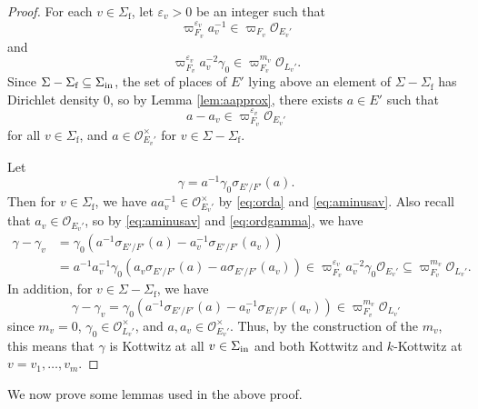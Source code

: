 \documentclass[11pt, reqno]{amsart}
\numberwithin{equation}{subsection}
\theoremstyle{plain}
\theoremstyle{definition}
\renewcommand{\O}{\mathcal O}
\newcommand{\inert}{\textnormal{in}}
\begin{document}
\begin{proof}
For each $v \in \Sigma_{\text{f}}$, let $\varepsilon_v > 0$
be an integer such that
\begin{equation}
\label{eq:orda}
    \varpi_{F_v}^{\varepsilon_v} a_v^{-1}
    \in \varpi_{F_v}\O_{E_v'}
\end{equation}
and
\begin{equation}
\label{eq:ordgamma}
   \varpi_{F_v}^{\varepsilon_v} a_v^{-2}\gamma_0
   \in \varpi_{F_v}^{m_v}\O_{L_v'}.
\end{equation}
Since $\Sigma - \Sigma_{\text{f}} \subseteq \Sigma_{\inert}$,
the set of places of $E'$ lying above an element of 
$\Sigma - \Sigma_{\text{f}}$ has Dirichlet density $0$, so
by Lemma \ref{lem:aapprox}, there exists
$a \in E'$ such that 
\begin{equation}
\label{eq:aminusav}
    a - a_v \in \varpi_{F_v}^{\varepsilon_v} \O_{E_v'}
\end{equation}
for all $v \in \Sigma_{\text{f}}$, and $a \in \O_{E_v'}^\times$
for $v \in \Sigma - \Sigma_{\text{f}}$.

Let
\[
    \gamma = a^{-1}\gamma_0\sigma_{E'/F'}(a).
\]
Then for $v \in \Sigma_{\text{f}}$, we have
$aa_v^{-1} \in \O_{E_v'}^\times$ by \eqref{eq:orda}
and \eqref{eq:aminusav}. Also recall that 
$a_v \in \O_{E_v'}$, so by \eqref{eq:aminusav}
and \eqref{eq:ordgamma}, we have
\begin{align*}
    \gamma - \gamma_v &= \gamma_0(a^{-1}\sigma_{E'/F'}(a) 
    - a_v^{-1}\sigma_{E'/F'}(a_v)) \\
    &= a^{-1}a_v^{-1}\gamma_0(a_v\sigma_{E'/F'}(a)
    - a\sigma_{E'/F'}(a_v)) \in \varpi_{F_v}^{\varepsilon_v} 
    a_v^{-2}\gamma_0 \O_{E_v'} \subseteq
    \varpi_{F_v}^{m_v}\O_{L_v'}.
\end{align*}
In addition, for $v \in \Sigma - \Sigma_{\text{f}}$, 
we have
\[
    \gamma - \gamma_v = \gamma_0(a^{-1}\sigma_{E'/F'}(a) 
    - a_v^{-1}\sigma_{E'/F'}(a_v)) \in \varpi_{F_v}^{m_v}\O_{L_v'}
\]
since $m_v = 0$, $\gamma_0 \in \O_{L_v'}^\times$,
and $a, a_v \in \O_{E_v'}^\times$.
Thus, by the construction of the $m_v$, this means
that $\gamma$ is Kottwitz at all $v \in \Sigma_{\inert}$ and
both Kottwitz and $k$-Kottwitz at $v = v_1, \dots, v_m$.
\end{proof}


We now prove some lemmas used in the above proof.
\end{document}

